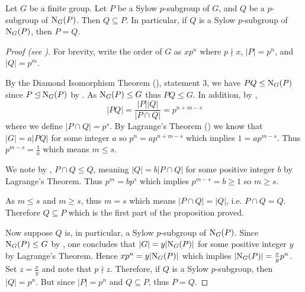 \begin{proposition}\label{prop-normalizer-of-sylow-p-subgroup}
    Let $G$ be a finite group. Let $P$ be a Sylow $p$-subgroup of $G$, and $Q$ be a $p$-subgroup of $\mathrm{N}_{G}(P)$. Then $Q \subseteq P$. In particular, if $Q$ is a Sylow $p$-subgroup of $\mathrm{N}_{G}(P)$, then $P = Q$.
\end{proposition}
\begin{proof}[Proof (see {\cite[Proposition 11.9]{humphreys_1996}})]
    For brevity, write the order of $G$ as $xp^n$ where $p \nmid x$, $|P| = p^n$, and $|Q| = p^m$.

    By the Diamond Isomorphism Theorem (), statement 3, we have $PQ \leq \mathrm{N}_{G}(P)$ since $P \unlhd \mathrm{N}_{G}(P)$ by . As $\mathrm{N}_{G}(P) \leq G$ thus $PQ \leq G$. In addition, by ,
    \[
        |PQ| = \frac{|P||Q|}{|P \cap Q|} = p^{n+m-s}
    \]
    where we define $|P \cap Q| = p^s$. By Lagrange's Theorem () we know that $|G| = a|PQ|$ for some integer $a$ so $p^n = ap^{n+m-s}$ which implies $1 = ap^{m-s}$. Thus $p^{m-s} = \frac 1a$ which means $m \leq s$.

    We note by , $P \cap Q \leq Q$, meaning $|Q| = b|P\cap Q|$ for some positive integer $b$ by Lagrange's Theorem. Thus $p^m = bp^s$ which implies $p^{m-s} = b \geq 1$ so $m \geq s$.

    As $m \leq s$ and $m \geq s$, thus $m = s$ which means $|P \cap Q| = |Q|$, i.e. $P \cap Q = Q$. Therefore $Q \subseteq P$ which is the first part of the proposition proved.

    Now suppose $Q$ is, in particular, a Sylow $p$-subgroup of $\mathrm{N}_{G}(P)$. Since $\mathrm{N}_{G}(P) \leq G$ by , one concludes that $|G| = y|\mathrm{N}_{G}(P)|$ for some positive integer $y$ by Lagrange's Theorem. Hence $xp^n = y|\mathrm{N}_{G}(P)|$ which implies $|\mathrm{N}_{G}(P)| = \frac{x}{y} p^n$. Set $z = \frac xy$ and note that $p \nmid z$. Therefore, if $Q$ is a Sylow $p$-subgroup, then $|Q| = p^n$. But since $|P| = p^n$ and $Q \subseteq P$, thus $P = Q$.
\end{proof}

